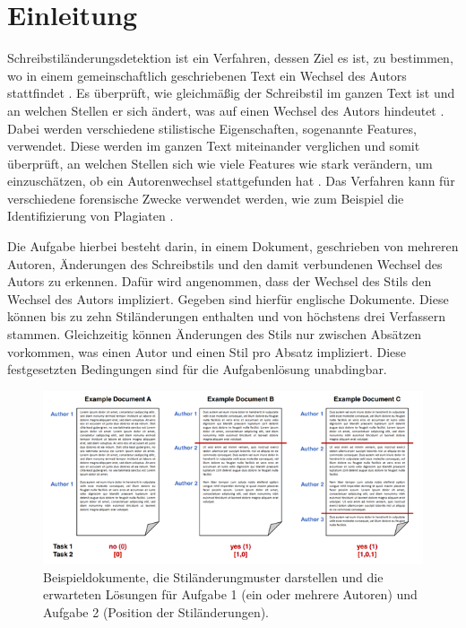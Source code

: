 \documentclass[conference]{IEEEtran}
\begin{document}
\section{Einleitung}
	Schreibstiländerungsdetektion ist ein Verfahren, dessen Ziel es ist, zu bestimmen, wo in einem gemeinschaftlich geschriebenen Text ein Wechsel des Autors stattfindet \cite{e_b1}. Es überprüft, wie gleichmäßig der Schreibstil im ganzen Text ist und an welchen Stellen er sich ändert, was auf einen Wechsel des Autors hindeutet \cite{e_b2}. Dabei werden verschiedene stilistische Eigenschaften, sogenannte Features, verwendet. Diese werden im ganzen Text miteinander verglichen und somit überprüft, an welchen Stellen sich wie viele Features wie stark verändern, um einzuschätzen, ob ein Autorenwechsel stattgefunden hat \cite{e_b3}. Das Verfahren kann für verschiedene forensische Zwecke verwendet werden, wie zum Beispiel die Identifizierung von Plagiaten \cite{e_b2}.
	
	
	Die Aufgabe hierbei besteht darin, in einem Dokument, geschrieben von mehreren Autoren, Änderungen des Schreibstils und den damit verbundenen Wechsel des Autors zu erkennen. Dafür wird angenommen, dass der Wechsel des Stils den Wechsel des Autors impliziert. Gegeben sind hierfür englische Dokumente. Diese können bis zu zehn Stiländerungen enthalten und von höchstens drei Verfassern stammen. Gleichzeitig können Änderungen des Stils nur zwischen Absätzen vorkommen, was einen Autor und einen Stil pro Absatz impliziert. Diese festgesetzten Bedingungen sind für die Aufgabenlösung unabdingbar.
	
	\begin{figure}[h]
		\centering
		\includegraphics[width=0.9\linewidth]{Aufgabenbeschreibung}
		\caption{Beispieldokumente, die Stiländerungmuster darstellen und die erwarteten Lösungen für  Aufgabe 1 (ein oder mehrere Autoren) und Aufgabe 2 (Position der Stiländerungen).\cite{e_b4}}
		\label{fig:aufgabe}
	\end{figure}
	
\end{document}
